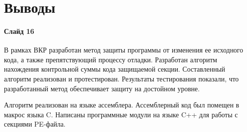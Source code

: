 
\section{Выводы}
 
\paragraph{Слайд 16}\mbox{}\par
В рамках ВКР разработан метод защиты программы от изменения ее исходного кода, а
также препятствующий процессу отладки. Разработан алгоритм нахождения
контрольной суммы кода защищаемой секции. Составленный алгоритм реализован и
протестирован. Результаты тестирования показали, что разработанный метод
обеспечивает защиту на достойном уровне.

Алгоритм реализован на языке ассемблера. Ассемблерный код был помещен в макрос
языка C. Написаны программные модули на языке C++ для работы с секциями
PE-файла.


